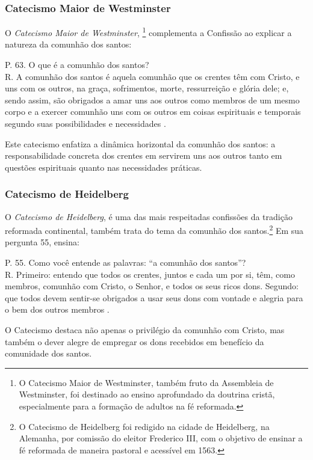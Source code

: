 \subsubsection{Catecismo Maior de Westminster}
O \textit{Catecismo Maior de Westminster}, \footnote{O Catecismo Maior de Westminster, também fruto da Assembleia de Westminster, foi destinado ao ensino aprofundado da doutrina cristã, especialmente para a formação de adultos na fé reformada.} complementa a Confissão ao explicar a natureza da comunhão dos santos:
\begin{citacao}
P. 63. O que é a comunhão dos santos?\\
R. A comunhão dos santos é aquela comunhão que os crentes têm com Cristo, e uns com os outros, na graça, sofrimentos, morte, ressurreição e glória dele; e, sendo assim, são obrigados a amar uns aos outros como membros de um mesmo corpo e a exercer comunhão uns com os outros em coisas espirituais e temporais segundo suas possibilidades e necessidades \cite{catecismoMaior}.
\end{citacao}

Este catecismo enfatiza a dinâmica horizontal da comunhão dos santos: a responsabilidade concreta dos crentes em servirem uns aos outros tanto em questões espirituais quanto nas necessidades práticas.

\subsubsection{Catecismo de Heidelberg}
O \textit{Catecismo de Heidelberg}, é uma das mais respeitadas confissões da tradição reformada continental, também trata do tema da comunhão dos santos.\footnote{O Catecismo de Heidelberg foi redigido na cidade de Heidelberg, na Alemanha, por comissão do eleitor Frederico III, com o objetivo de ensinar a fé reformada de maneira pastoral e acessível em 1563.} Em sua pergunta 55, ensina:
\begin{citacao}
P. 55. Como você entende as palavras: ``a comunhão dos santos''?\\
R. Primeiro: entendo que todos os crentes, juntos e cada um por si, têm, como membros, comunhão com Cristo, o Senhor, e todos os seus ricos dons. Segundo: que todos devem sentir-se obrigados a usar seus dons com vontade e alegria para o bem dos outros membros \cite{heidelberg}.
\end{citacao}

O Catecismo destaca não apenas o privilégio da comunhão com Cristo, mas também o dever alegre de empregar os dons recebidos em benefício da comunidade dos santos.


